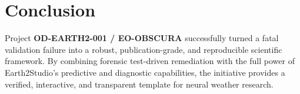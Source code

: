 \documentclass[10pt,twocolumn,a4paper]{article}
\begin{document}
\section{Conclusion}
Project \textbf{OD-EARTH2-001 / EO-OBSCURA} successfully turned a fatal validation failure into a robust, publication-grade, and reproducible scientific framework. By combining forensic test-driven remediation with the full power of Earth2Studio's predictive and diagnostic capabilities, the initiative provides a verified, interactive, and transparent template for neural weather research.
\end{document}
